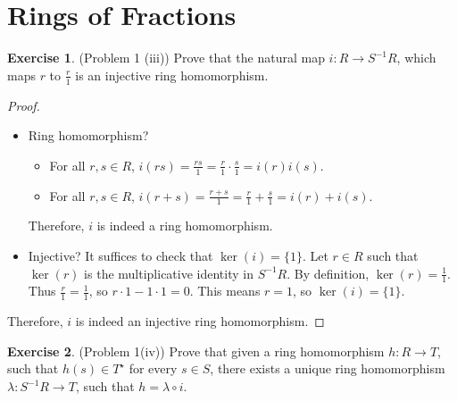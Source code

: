 \documentclass[12pt, psamsfonts]{amsart}
\theoremstyle{definition}
\newtheorem*{exer}{Exercise}
\theoremstyle{remark}
\numberwithin{equation}{section}
\begin{document}
\section{Rings of Fractions}
\begin{exer}{(Problem 1 (iii))}
  Prove that the natural map $i: R \rightarrow S^{-1}R$, which maps $r$ to $\frac{r}{1}$ is an injective ring homomorphism.
\end{exer}

\begin{proof}
  $ $
  \begin{itemize}
    \item
      Ring homomorphism?
      \begin{itemize}
        \item
          For all $r, s \in R$, $i(rs) = \frac{rs}{1} = \frac{r}{1} \cdot \frac{s}{1} = i(r)i(s)$.
        \item
          For all $r, s \in R$, $i(r + s) = \frac{r + s}{1} = \frac{r}{1} + \frac{s}{1} = i(r) + i(s)$.
      \end{itemize}
      Therefore, $i$ is indeed a ring homomorphism.
    \item
      Injective?
      It suffices to check that $\ker(i) = \{ 1 \}$.
      Let $r \in R$ such that $\ker(r)$ is the multiplicative identity in $S^{-1}R$.
      By definition, $\ker(r) = \frac{1}{1}$.
      Thus $\frac{r}{1} = \frac{1}{1}$, so $r \cdot 1 - 1 \cdot 1 = 0$.
      This means $r = 1$, so $\ker(i) = \{ 1 \}$.
  \end{itemize}
  Therefore, $i$ is indeed an injective ring homomorphism.
\end{proof}

\begin{exer}{(Problem 1(iv))}
  Prove that given a ring homomorphism $h: R \rightarrow T$, such that $h(s) \in T^{\star}$ for every $s \in S$, there exists a unique ring homomorphism $\lambda: S^{-1}R \rightarrow T$, such that $h = \lambda \circ i$.
\end{exer}
\end{document}
